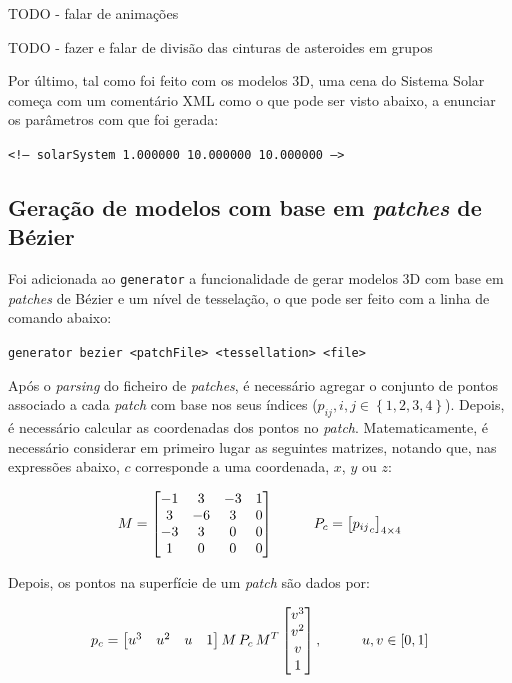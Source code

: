 \documentclass[12pt, a4paper]{article}
\begin{document}
{\color{red} TODO - falar de animações}

{\color{red} TODO - fazer e falar de divisão das cinturas de asteroides em grupos}

Por último, tal como foi feito com os modelos 3D, uma cena do Sistema Solar começa com um comentário
XML como o que pode ser visto abaixo, a enunciar os parâmetros com que foi gerada:

\begin{center}
    \texttt{<!-- solarSystem 1.000000 10.000000 10.000000 -->}
\end{center}

\subsection{Geração de modelos com base em \emph{patches} de Bézier}

Foi adicionada ao \texttt{generator} a funcionalidade de gerar modelos 3D com base em \emph{patches}
de Bézier e um nível de tesselação, o que pode ser feito com a linha de comando abaixo:

\begin{center}
    \texttt{generator bezier <patchFile> <tessellation> <file>}
\end{center}

Após o \emph{parsing} do ficheiro de \emph{patches}, é necessário agregar o conjunto de pontos
associado a cada \emph{patch} com base nos seus índices
($p_{i j}, i, j \in \left \lbrace 1,2,3,4 \right \rbrace$). Depois, é necessário calcular as
coordenadas dos pontos no \emph{patch}. Matematicamente, é necessário considerar em primeiro lugar
as seguintes matrizes, notando que, nas expressões abaixo, $c$ corresponde a uma coordenada, $x$,
$y$ ou $z$:

$$
\def\arraystretch{1}
M =
\begin{bmatrix}
    -1 &  3 & -3 & 1 \\
     3 & -6 &  3 & 0 \\
    -3 &  3 &  0 & 0 \\
     1 &  0 &  0 & 0
\end{bmatrix}
\hspace{1cm}
P_c = \left [ {p_{i j}}_{c} \right ] _ {4 \times 4}
$$

Depois, os pontos na superfície de um \emph{patch} são dados por:

$$
\def\arraystretch{1}
p_c =
\begin{bmatrix}
    u^3 & u^2 & u & 1
\end{bmatrix}
M \, P_c \, M^T
\begin{bmatrix}
    v^3 \\ v^2 \\ v \\ 1
\end{bmatrix},
\hspace{1cm}
u, v \in \left [ 0, 1 \right ]
$$
\end{document}
